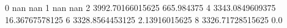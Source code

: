 0 nan nan
1 nan nan
2 3992.70166015625 665.984375
4 3343.0849609375 16.36767578125
6 3328.8564453125 2.13916015625
8 3326.71728515625 0.0
